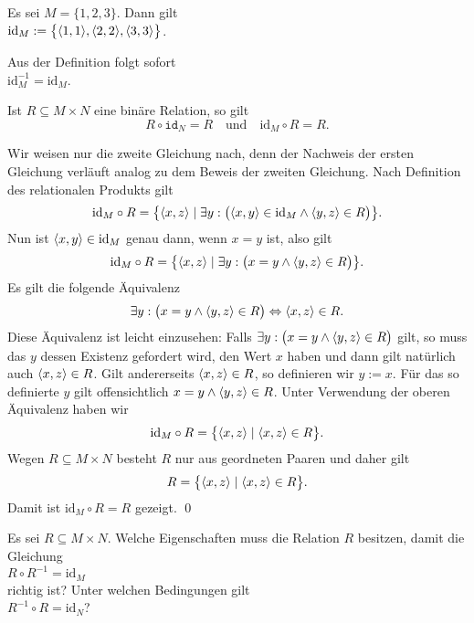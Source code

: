 \example
Es sei $M = \{1,2,3\}$.  Dann gilt \\[0.2cm]
\hspace*{1.3cm}  $\mathrm{id}_M := \bigl\{ \pair(1,1),  \pair(2,2),  \pair(3,3) \bigr\}$.  \eox
\vspace*{0.2cm}

\remark
Aus der Definition folgt sofort \\[0.2cm]
\hspace*{1.3cm} $\mathrm{id}_M^{-1} = \mathrm{id}_M$. \eox

\begin{Satz}
  Ist $R \subseteq M \times N$  eine bin\"{a}re Relation, so gilt 
  \[ R \circ \mathtt{id}_N = R \quad \mbox{und} \quad \mathrm{id}_M \circ R = R. \] 
\end{Satz}

\proof
Wir weisen nur die zweite Gleichung nach, denn der Nachweis der ersten Gleichung verl\"{a}uft analog zu
dem Beweis der zweiten Gleichung.  Nach Definition des relationalen Produkts
gilt
\[ \mathrm{id}_M \circ R = \bigl\{ \pair(x,z) \mid \exists y:\bigl(\pair(x,y) \in \mathrm{id}_M \wedge \pair(y,z) \in R \bigr)\bigr\}. \]
Nun ist $\pair(x,y) \in \mathrm{id}_M$ genau dann, wenn $x = y$ ist, also gilt
\[ \mathrm{id}_M \circ R = \bigl\{ \pair(x,z) \mid \exists y:\bigl( x = y \wedge \pair(y,z) \in R\bigr) \bigr\}. \]
Es gilt die folgende \"{A}quivalenz
\[ \exists y:\bigl(x = y \wedge \pair(y,z) \in R \bigr) \Leftrightarrow \pair(x,z) \in R. \]
Diese \"{A}quivalenz ist leicht einzusehen:  Falls $\exists y:\bigl( x = y \wedge \pair(y,z) \in R\bigr)$
gilt, so muss das $y$ dessen Existenz gefordert wird, den Wert $x$ haben und dann gilt
nat\"{u}rlich auch $\pair(x,z) \in R$.  Gilt andererseits $\pair(x,z) \in R$, so definieren
wir $y := x$.  F\"{u}r das so definierte $y$ gilt offensichtlich 
$x = y \wedge \pair(y,z) \in R$.  Unter Verwendung der oberen \"{A}quivalenz haben wir 
\[ \mathrm{id}_M \circ R = \bigl\{ \pair(x,z) \mid \pair(x,z) \in R \bigr\}. \]
Wegen  $R \subseteq M \times N$ besteht $R$ nur aus geordneten
Paaren und daher gilt
\[ R = \bigl\{ \pair(x,z) \mid \pair(x,z) \in R \bigr\}. \]
Damit ist $\mathrm{id}_M \circ R = R$ gezeigt. \qed


\exercise
Es sei $R \subseteq M \times N$.  Welche Eigenschaften muss die Relation $R$ besitzen, damit die Gleichung 
\\[0.2cm]
\hspace*{1.3cm}
$R \circ R^{-1} = \mathrm{id}_M$ 
\\[0.2cm]
richtig ist? Unter welchen Bedingungen gilt
\\[0.2cm]
\hspace*{1.3cm}
$R^{-1} \circ R = \mathrm{id}_N$?
\eox


